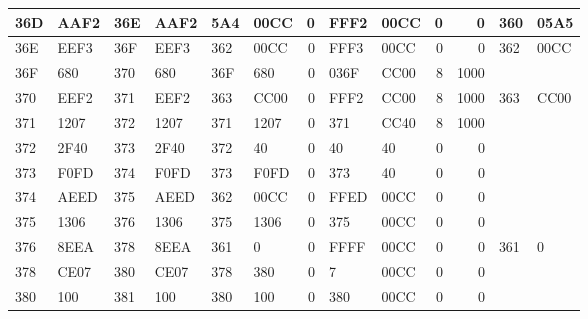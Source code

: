\begin{center}
\begin{tabular}{|l|l|l|l|l|l|r|l|l|r|r|l|l|}
        \hline
        36D          & AAF2          & 36E         & AAF2        & 5A4         & 00CC        & 0           & FFF2        & 00CC        & 0           & 0             & 360          & 05A5          \\
        \hline
        36E          & EEF3          & 36F         & EEF3        & 362         & 00CC        & 0           & FFF3        & 00CC        & 0           & 0             & 362          & 00CC          \\
        \hline
        36F          & 680           & 370         & 680         & 36F         & 680         & 0           & 036F        & CC00        & 8           & 1000          &              &               \\
        \hline
        370          & EEF2          & 371         & EEF2        & 363         & CC00        & 0           & FFF2        & CC00        & 8           & 1000          & 363          & CC00          \\
        \hline
        371          & 1207          & 372         & 1207        & 371         & 1207        & 0           & 371         & CC40        & 8           & 1000          &              &               \\
        \hline
        372          & 2F40          & 373         & 2F40        & 372         & 40          & 0           & 40          & 40          & 0           & 0             &              &               \\
        \hline
        373          & F0FD          & 374         & F0FD        & 373         & F0FD        & 0           & 373         & 40          & 0           & 0             &              &               \\
        \hline
        374          & AEED          & 375         & AEED        & 362         & 00CC        & 0           & FFED        & 00CC        & 0           & 0             &              &               \\
        \hline
        375          & 1306          & 376         & 1306        & 375         & 1306        & 0           & 375         & 00CC        & 0           & 0             &              &               \\
        \hline
        376          & 8EEA          & 378         & 8EEA        & 361         & 0           & 0           & FFFF        & 00CC        & 0           & 0             & 361          & 0             \\
        \hline
        378          & CE07          & 380         & CE07        & 378         & 380         & 0           & 7           & 00CC        & 0           & 0             &              &               \\
        \hline
        380          & 100           & 381         & 100         & 380         & 100         & 0           & 380         & 00CC        & 0           & 0             &              &               \\
        \bottomrule
    \end{tabular}
\end{center}
\newpage


